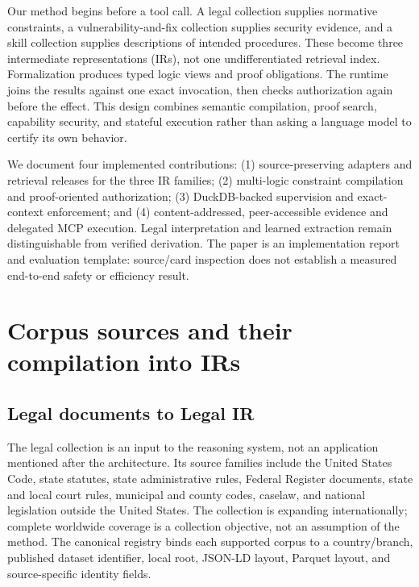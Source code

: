 \documentclass{article}
\begin{document}
Our method begins before a tool call. A legal collection supplies normative constraints, a vulnerability-and-fix collection supplies security evidence, and a skill collection supplies descriptions of intended procedures. These become three intermediate representations (IRs), not one undifferentiated retrieval index. Formalization produces typed logic views and proof obligations. The runtime joins the results against one exact invocation, then checks authorization again before the effect. This design combines semantic compilation, proof search, capability security, and stateful execution rather than asking a language model to certify its own behavior.

We document four implemented contributions: (1) source-preserving adapters and retrieval releases for the three IR families; (2) multi-logic constraint compilation and proof-oriented authorization; (3) DuckDB-backed supervision and exact-context enforcement; and (4) content-addressed, peer-accessible evidence and delegated MCP execution. Legal interpretation and learned extraction remain distinguishable from verified derivation. The paper is an implementation report and evaluation template: source/card inspection does not establish a measured end-to-end safety or efficiency result.

\section{Corpus sources and their compilation into IRs}

\subsection{Legal documents to Legal IR}

The legal collection is an input to the reasoning system, not an application mentioned after the architecture. Its source families include the United States Code, state statutes, state administrative rules, Federal Register documents, state and local court rules, municipal and county codes, caselaw, and national legislation outside the United States. The collection is expanding internationally; complete worldwide coverage is a collection objective, not an assumption of the method. The canonical registry binds each supported corpus to a country/branch, published dataset identifier, local root, JSON-LD layout, Parquet layout, and source-specific identity fields.
\end{document}
